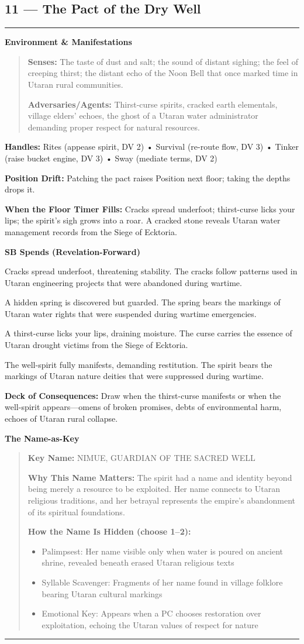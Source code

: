 \documentclass[18pt, letterpaper, twoside]{article}
\newenvironment{floorbox}[1]{%
    \begin{center}
    \begin{minipage}{0.95\textwidth}
    \subsection*{#1}
    \vspace{-0.5em}
    \rule{\textwidth}{0.5pt}
    \vspace{0.5em}
}{%
    \vspace{0.5em}
    \rule{\textwidth}{0.5pt}
    \end{minipage}
    \end{center}
}
\newenvironment{gmnote}[1]{%
    \vspace{0.5em}
    \noindent\textbf{#1}
    \begin{quote}
}{%
    \end{quote}
    \vspace{0.5em}
}
\newcommand{\handles}[1]{\noindent\textbf{Handles:} #1\par}
\newcommand{\sbitem}[2]{\item[#1 SB:] #2}
\newcommand{\deckdraw}[1]{\noindent\textbf{Deck of Consequences:} #1\par}
\newcommand{\keyname}[1]{\noindent\textbf{Key Name:} #1\par}
\newcommand{\nameimportance}[1]{\noindent\textbf{Why This Name Matters:} #1\par}
\begin{document}
\begin{floorbox}{11 --- The Pact of the Dry Well}
\begin{gmnote}{Environment \& Manifestations}
\textbf{Senses:} The taste of dust and salt; the sound of distant sighing; the feel of creeping thirst; the distant echo of the Noon Bell that once marked time in Utaran rural communities.

\textbf{Adversaries/Agents:} Thirst-curse spirits, cracked earth elementals, village elders' echoes, the ghost of a Utaran water administrator demanding proper respect for natural resources.
\end{gmnote}

\handles{Rites (appease spirit, DV 2) • Survival (re-route flow, DV 3) • Tinker (raise bucket engine, DV 3) • Sway (mediate terms, DV 2)}

\textbf{Position Drift:} Patching the pact raises Position next floor; taking the depths drops it.

\textbf{When the Floor Timer Fills:} Cracks spread underfoot; thirst-curse licks your lips; the spirit's sigh grows into a roar. A cracked stone reveals Utaran water management records from the Siege of Ecktoria.

\textbf{SB Spends (Revelation-Forward)}
\begin{description}[leftmargin=*, style=unboxed]
    \sbitem{1}{Cracks spread underfoot, threatening stability. The cracks follow patterns used in Utaran engineering projects that were abandoned during wartime.}
    \sbitem{2}{A hidden spring is discovered but guarded. The spring bears the markings of Utaran water rights that were suspended during wartime emergencies.}
    \sbitem{3}{A thirst-curse licks your lips, draining moisture. The curse carries the essence of Utaran drought victims from the Siege of Ecktoria.}
    \sbitem{4+}{The well-spirit fully manifests, demanding restitution. The spirit bears the markings of Utaran nature deities that were suppressed during wartime.}
\end{description}

\deckdraw{Draw when the thirst-curse manifests or when the well-spirit appears---omens of broken promises, debts of environmental harm, echoes of Utaran rural collapse.}

\begin{gmnote}{The Name-as-Key}
\keyname{NIMUE, GUARDIAN OF THE SACRED WELL}
\nameimportance{The spirit had a name and identity beyond being merely a resource to be exploited. Her name connects to Utaran religious traditions, and her betrayal represents the empire's abandonment of its spiritual foundations.}

\textbf{How the Name Is Hidden (choose 1--2):}
\begin{itemize}[leftmargin=*]
    \item Palimpsest: Her name visible only when water is poured on ancient shrine, revealed beneath erased Utaran religious texts
    \item Syllable Scavenger: Fragments of her name found in village folklore bearing Utaran cultural markings
    \item Emotional Key: Appears when a PC chooses restoration over exploitation, echoing the Utaran values of respect for nature
\end{itemize}


\end{gmnote}
\end{floorbox}
\end{document}
